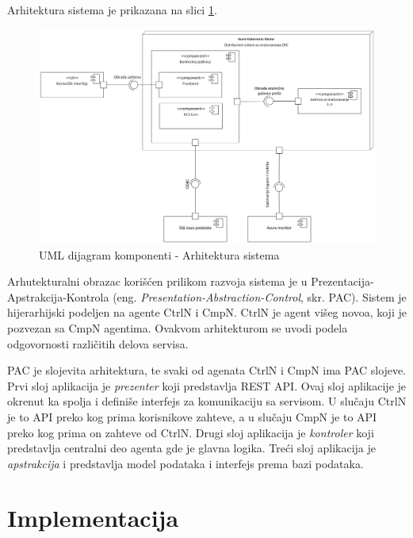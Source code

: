 \documentclass[12pt,oneside]{memoir}
\begin{document}
Arhitektura sistema je prikazana na slici \ref{fig:arhitektura}.

\begin{figure}[!ht]
  \centering
  \includegraphics[width=1.0\textwidth]{./images/arhitektura_sistema_dijagram_komponenti.png}
  \caption{UML dijagram komponenti - Arhitektura sistema}
  \label{fig:arhitektura}
\end{figure}

Arhutekturalni obrazac korišćen prilikom razvoja sistema je u Prezentacija-Apstrakcija-Kontrola (eng. \emph{Presentation-Abstraction-Control}, skr. PAC). Sistem je hijerarhijski podeljen na agente CtrlN i CmpN. CtrlN je agent višeg novoa, koji je pozvezan sa CmpN agentima. Ovakvom arhitekturom se uvodi podela odgovornosti različitih delova servisa.

PAC je slojevita arhitektura, te svaki od agenata CtrlN i CmpN ima PAC slojeve. Prvi sloj aplikacija je \emph{prezenter} koji predstavlja REST API. Ovaj sloj aplikacije je okrenut ka spolja i definiše interfejs za komunikaciju sa servisom. U slučaju CtrlN je to API preko kog prima korisnikove zahteve, a u slučaju CmpN je to API preko kog prima on zahteve od CtrlN. Drugi sloj aplikacija je \emph{kontroler} koji predstavlja centralni deo agenta gde je glavna logika. Treći sloj aplikacija je \emph{apstrakcija} i predstavlja model podataka i interfejs prema bazi podataka. 


\section{Implementacija}
\end{document}
